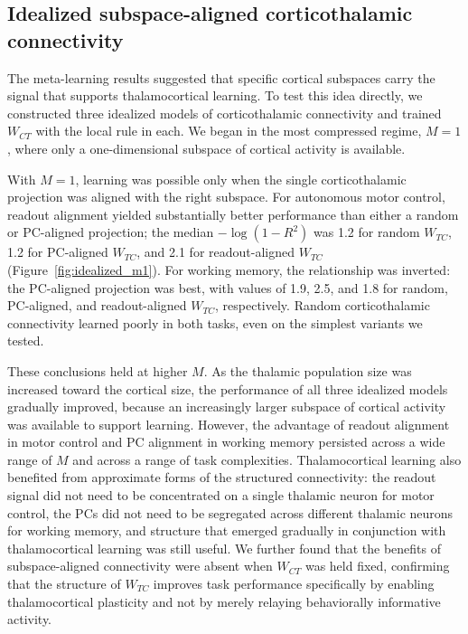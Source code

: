 \documentclass[11pt]{article}
\begin{document}
\subsection{Idealized subspace-aligned corticothalamic connectivity}

The meta-learning results suggested that specific cortical subspaces
carry the signal that supports thalamocortical learning. To test this
idea directly, we constructed three idealized models of
corticothalamic connectivity and trained $W_{CT}$ with the local rule
in each. We began in the most compressed regime, $M = 1$, where only a
one-dimensional subspace of cortical activity is available.

With $M = 1$, learning was possible only when the single
corticothalamic projection was aligned with the right subspace. For
autonomous motor control, readout alignment yielded substantially
better performance than either a random or PC-aligned projection; the
median $-\log(1 - R^2)$ was 1.2 for random $W_{TC}$, 1.2 for
PC-aligned $W_{TC}$, and 2.1 for readout-aligned $W_{TC}$
(Figure~\ref{fig:idealized_m1}). For working memory, the relationship
was inverted: the PC-aligned projection was best, with values of 1.9,
2.5, and 1.8 for random, PC-aligned, and readout-aligned $W_{TC}$,
respectively. Random corticothalamic connectivity learned poorly in
both tasks, even on the simplest variants we tested.

These conclusions held at higher $M$. As the thalamic population size
was increased toward the cortical size, the performance of all three
idealized models gradually improved, because an increasingly larger
subspace of cortical activity was available to support learning.
However, the advantage of readout alignment in motor control and PC
alignment in working memory persisted across a wide range of $M$ and
across a range of task complexities. Thalamocortical learning also
benefited from approximate forms of the structured connectivity: the
readout signal did not need to be concentrated on a single thalamic
neuron for motor control, the PCs did not need to be segregated across
different thalamic neurons for working memory, and structure that
emerged gradually in conjunction with thalamocortical learning was
still useful. We further found that the benefits of subspace-aligned
connectivity were absent when $W_{CT}$ was held fixed, confirming that
the structure of $W_{TC}$ improves task performance specifically by
enabling thalamocortical plasticity and not by merely relaying
behaviorally informative activity.
\end{document}
